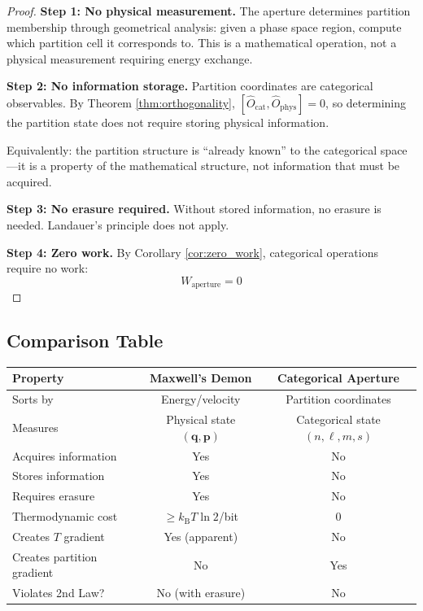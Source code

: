 \documentclass[twocolumn,10pt,twoside]{article}
\newcommand{\kb}{k_{\mathrm{B}}}
\newcommand{\Ocat}{\hat{O}_{\mathrm{cat}}}
\newcommand{\Ophys}{\hat{O}_{\mathrm{phys}}}
\newcommand{\partcoord}{(n,\ell,m,s)}
\begin{document}
\begin{proof}
\textbf{Step 1: No physical measurement.}
The aperture determines partition membership through geometrical analysis: given a phase space region, compute which partition cell it corresponds to. This is a mathematical operation, not a physical measurement requiring energy exchange.

\textbf{Step 2: No information storage.}
Partition coordinates are categorical observables. By Theorem \ref{thm:orthogonality}, $[\Ocat, \Ophys] = 0$, so determining the partition state does not require storing physical information.

Equivalently: the partition structure is ``already known'' to the categorical space---it is a property of the mathematical structure, not information that must be acquired.

\textbf{Step 3: No erasure required.}
Without stored information, no erasure is needed. Landauer's principle does not apply.

\textbf{Step 4: Zero work.}
By Corollary \ref{cor:zero_work}, categorical operations require no work:
\begin{equation}
W_{\text{aperture}} = 0
\end{equation}
\end{proof}

\subsection{Comparison Table}

\begin{center}
\begin{tabular}{lcc}
\toprule
\textbf{Property} & \textbf{Maxwell's Demon} & \textbf{Categorical Aperture} \\
\midrule
Sorts by & Energy/velocity & Partition coordinates \\
Measures & Physical state $(\mathbf{q}, \mathbf{p})$ & Categorical state $\partcoord$ \\
Acquires information & Yes & No \\
Stores information & Yes & No \\
Requires erasure & Yes & No \\
Thermodynamic cost & $\geq \kb T \ln 2$/bit & 0 \\
Creates $T$ gradient & Yes (apparent) & No \\
Creates partition gradient & No & Yes \\
Violates 2nd Law? & No (with erasure) & No \\
\bottomrule
\end{tabular}
\end{center}
\end{document}
